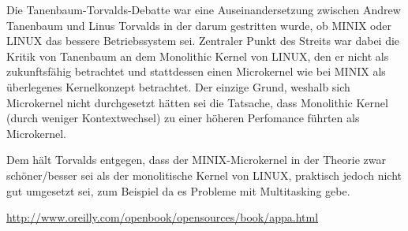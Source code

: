 \documentclass[numbers=noendperiod]{scrartcl}
\begin{document}
Die Tanenbaum-Torvalds-Debatte war eine Auseinandersetzung zwischen Andrew Tanenbaum und Linus Torvalds in der darum gestritten wurde, ob MINIX oder LINUX das bessere Betriebssystem sei. Zentraler Punkt des Streits war dabei die Kritik von Tanenbaum an dem Monolithic Kernel von LINUX, den er nicht als zukunftsfähig betrachtet und stattdessen einen Microkernel wie bei MINIX als überlegenes Kernelkonzept betrachtet. Der einzige Grund, weshalb sich Microkernel nicht durchgesetzt hätten sei die Tatsache, dass Monolithic Kernel (durch weniger Kontextwechsel) zu einer höheren Perfomance führten als Microkernel.

Dem hält Torvalds entgegen, dass der MINIX-Microkernel in der Theorie zwar schöner/besser sei als der monolitische Kernel von LINUX, praktisch jedoch nicht gut umgesetzt sei, zum Beispiel da es Probleme mit Multitasking gebe.


\url{http://www.oreilly.com/openbook/opensources/book/appa.html}
\end{document}
